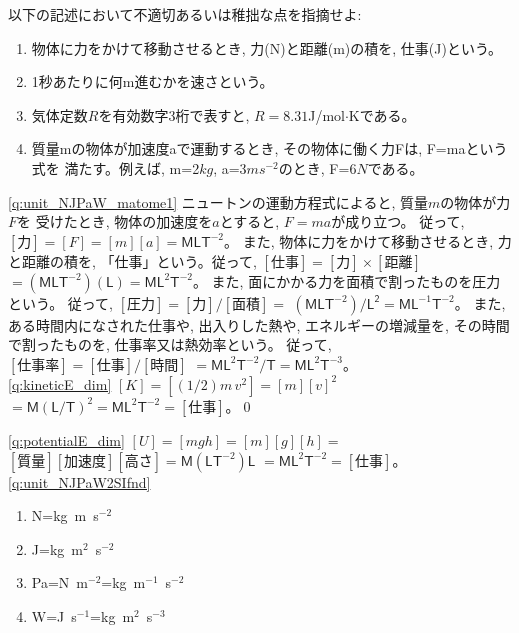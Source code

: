 \begin{q}\label{q:notation_wrong} 以下の記述において不適切あるいは稚拙な点を指摘せよ:
\begin{enumerate}
\item 物体に力をかけて移動させるとき, 力(N)と距離(m)の積を, 仕事(J)という。
\item 1秒あたりに何m進むかを速さという。
\item 気体定数$R$を有効数字3桁で表すと, $R=8.31 $J/mol$\cdot$Kである。 
\item 質量mの物体が加速度aで運動するとき, その物体に働く力Fは, F=maという式を
満たす。例えば, m=2$kg$, a=3$ms^{-2}$のとき, F=6$N$である。
\end{enumerate}
\end{q}




\ref{q:unit_NJPaW_matome1}
ニュートンの運動方程式によると, 質量$m$の物体が力$F$を
受けたとき, 物体の加速度を$a$とすると, $F=ma$が成り立つ。
従って, $[\text{力}]=[F]=[m][a]=\mathsf{MLT}^{-2}$。
また, 物体に力をかけて移動させるとき, 力と距離の積を, 
「仕事」という。従って, $[\text{仕事}]=[\text{力}]\times[\text{距離}]$
$=(\mathsf{MLT}^{-2})(\mathsf{L})=\mathsf{ML}^2\mathsf{T}^{-2}$。
また, 面にかかる力を面積で割ったものを圧力という。
従って, $[\text{圧力}]=[\text{力}]/[\text{面積}]=$
$(\mathsf{MLT}^{-2})/\mathsf{L^2}=\mathsf{ML}^{-1}\mathsf{T}^{-2}$。
また, ある時間内になされた仕事や, 出入りした熱や, 
エネルギーの増減量を, その時間で割ったものを, 仕事率又は熱効率という。
従って, $[\text{仕事率}]=[\text{仕事}]/[\text{時間}]$
$=\mathsf{ML}^2\mathsf{T}^{-2}/\mathsf{T}=\mathsf{ML}^2\mathsf{T}^{-3}$。\\

\ref{q:kineticE_dim} $[K]=[(1/2)m\,v^2]=[m][v]^2$
$=\mathsf{M}(\mathsf{L}/\mathsf{T})^2=\mathsf{M}\mathsf{L}^2\mathsf{T}^{-2}=[\text{仕事}]$。\qed

\ref{q:potentialE_dim} $[U]=[mgh]=[m][g][h]=$
$[\text{質量}][\text{加速度}][\text{高さ}]=\mathsf{M}(\mathsf{LT}^{-2})\mathsf{L}$
$=\mathsf{M}\mathsf{L}^2\mathsf{T}^{-2}=[\text{仕事}]$。\\



\ref{q:unit_NJPaW2SIfnd}　
\begin{enumerate}
\item N=kg~m~s$^{-2}$
\item J=kg~m$^2$~s$^{-2}$
\item Pa=N~m$^{-2}$=kg~m$^{-1}$~s$^{-2}$
\item W=J~s$^{-1}$=kg~m$^2$~s$^{-3}$
\end{enumerate}
\mv




